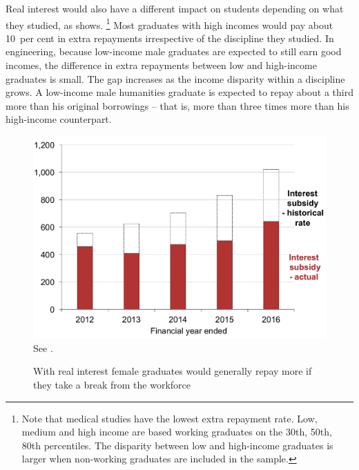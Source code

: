 \documentclass[embargoed]{grattan}
\begin{document}
Real interest would also have a different impact on students depending on what they studied, as  shows.%
\footnote{Note that medical studies have the lowest extra repayment rate.
Low, medium and high income are based working graduates on the 30{th}, 50{th}, 80{th} percentiles.\label{fn:low-med-high-dfns}
The disparity between low and high-income graduates is larger when non-working graduates are included in the sample.} Most graduates with high incomes would pay about 10~per cent in extra repayments irrespective of the discipline they studied.
In engineering, because low-income male graduates are expected to still earn good incomes, the difference in extra repayments between low and high-income graduates is small.
The gap increases as the income disparity within a discipline grows.
A low-income male humanities graduate is expected to repay about a third more than his original borrowings -- that is, more than three times more than his high-income counterpart.

\begin{figure}
\caption{With real interest female graduates would generally repay more if they take a break from the workforce}\label{fig:fig15-with-real-interest-female-grads-would-repay-more-if-they-took-break-from-workforce}


\includegraphics[page=15]{atlas/Chartpack.pdf}
{See .}
\end{figure}
\end{document}
